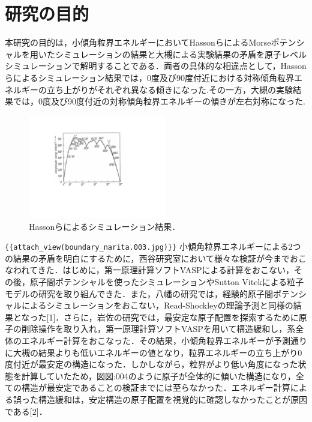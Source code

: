 
\section{研究の目的}
本研究の目的は，小傾角粒界エネルギーにおいてHassonらによるMorseポテンシャルを用いたシミュレーションの結果と大槻による実験結果の矛盾を原子レベルシミュレーションで解明することである．両者の具体的な相違点として，Hassonらによるシミュレーション結果では，0度及び90度付近における対称傾角粒界エネルギーの立ち上がりがそれぞれ異なる傾きになった.その一方，大槻の実験結果では，0度及び90度付近の対称傾角粒界エネルギーの傾きが左右対称になった.

\begin{figure}[htbp]\begin{center}
\includegraphics[width=6cm,bb=0 0 442 500]{../figs/./boundary_narita.002.jpg}
\caption{Hassonらによるシミュレーション結果．}
\label{default}\end{center}\end{figure}
\verb|{{attach_view(boundary_narita.003.jpg)}}|
小傾角粒界エネルギーによる2つの結果の矛盾を明白にするために，西谷研究室において様々な検証が今までおこなわれてきた．はじめに，第一原理計算ソフトVASPによる計算をおこない，その後，原子間ポテンシャルを使ったシミュレーションやSutton Vitekによる粒子モデルの研究を取り組んできた．また，八幡の研究では，経験的原子間ポテンシャルによるシミュレーションをおこない，Read-Shockleyの理論予測と同様の結果となった[1]．さらに，岩佐の研究では，最安定な原子配置を探索するために原子の削除操作を取り入れ，第一原理計算ソフトVASPを用いて構造緩和し，系全体のエネルギー計算をおこなった．その結果，小傾角粒界エネルギーが予測通りに大槻の結果よりも低いエネルギーの値となり，粒界エネルギーの立ち上がり0度付近が最安定の構造になった．しかしながら，粒界がより低い角度になった状態を計算していたため，図{図:004}のように原子が全体的に傾いた構造になり，全ての構造が最安定であることの検証までには至らなかった．エネルギー計算による誤った構造緩和は，安定構造の原子配置を視覚的に確認しなかったことが原因である[2]．

